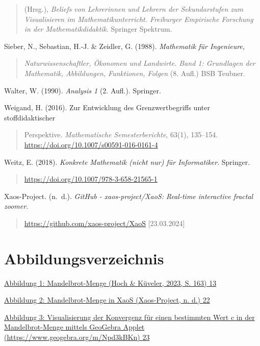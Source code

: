 \documentclass{book}
\begin{document}
\begin{quote}
(Hrsg.), \emph{Beliefs von Lehrerinnen und Lehrern der Sekundarstufen
zum Visualisieren im Mathematikunterricht. Freiburger Empirische
Forschung in der Mathematikdidaktik}. Springer Spektrum.
\end{quote}

Sieber, N., Sebastian, H.-J. \& Zeidler, G. (1988). \emph{Mathematik für
Ingenieure,}

\begin{quote}
\emph{Naturwissenschaftler, Ökonomen und Landwirte. Band 1: Grundlagen
der Mathematik, Abbildungen, Funktionen, Folgen} (8. Aufl.) BSB Teubner.
\end{quote}

Walter, W. (1990). \emph{Analysis 1} (2. Aufl.). Springer.

Weigand, H. (2016). Zur Entwicklung des Grenzwertbegriffs unter
stoffdidaktischer

\begin{quote}
Perspektive. \emph{Mathematische Semesterberichte}, 63(1), 135--154.
\url{https://doi.org/10.1007/s00591-016-0161-4}
\end{quote}

Weitz, E. (2018). \emph{Konkrete Mathematik (nicht nur) für
Informatiker}. Springer.

\begin{quote}
\url{https://doi.org/10.1007/978-3-658-21565-1}
\end{quote}

Xaos-Project. (n.~d.). \emph{GitHub - xaos-project/XaoS: Real-time
interactive fractal zoomer}.

\begin{quote}
\url{https://github.com/xaos-project/XaoS} {[}23.03.2024{]}
\end{quote}

\hypertarget{abbildungsverzeichnis}{%
\section{Abbildungsverzeichnis}\label{abbildungsverzeichnis}}

\protect\hyperlink{_Toc167901651}{Abbildung 1: Mandelbrot-Menge (Hoch \&
Küveler, 2023, S. 163) \protect\hyperlink{_Toc167901651}{13}}

\protect\hyperlink{_Toc167901652}{Abbildung 2: Mandelbrot-Menge in XaoS
(Xaos-Project, n. d.) \protect\hyperlink{_Toc167901652}{22}}

\protect\hyperlink{_Toc167901653}{Abbildung 3: Visualisierung der
Konvergenz für einen bestimmten Wert c in der Mandelbrot-Menge mittels
GeoGebra Applet (https://www.geogebra.org/m/Npd3kBKn)
\protect\hyperlink{_Toc167901653}{23}}
\end{document}
